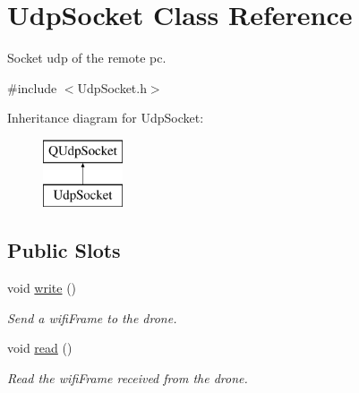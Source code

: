 \hypertarget{classUdpSocket}{\section{Udp\-Socket Class Reference}
\label{classUdpSocket}
}


Socket udp of the remote pc.  




{\ttfamily \#include $<$Udp\-Socket.\-h$>$}

Inheritance diagram for Udp\-Socket\-:\begin{figure}[H]
\begin{center}
\leavevmode
\includegraphics[height=2.000000cm]{classUdpSocket}
\end{center}
\end{figure}
\subsection*{Public Slots}
\begin{DoxyCompactItemize}
\item 
void \hyperlink{classUdpSocket_a3aba1f82aae7c3dc2b0b8487740a4c46}{write} ()
\begin{DoxyCompactList}\small\item\em Send a wifi\-Frame to the drone. \end{DoxyCompactList}\item 
void \hyperlink{classUdpSocket_a4f575273cf1629ed4a46d33b9d955100}{read} ()
\begin{DoxyCompactList}\small\item\em Read the wifi\-Frame received from the drone. \end{DoxyCompactList}\end{DoxyCompactItemize}
